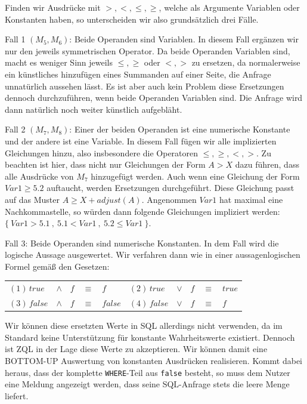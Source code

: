 Finden wir Ausdrücke mit $>,<,\leq,\geq$, welche als Argumente Variablen oder Konstanten haben, so unterscheiden wir also grundsätzlich drei Fälle.

Fall 1 $(M_5,M_6)$: Beide Operanden sind Variablen. In diesem Fall ergänzen wir nur den jeweils symmetrischen Operator. Da beide Operanden Variablen sind, macht es weniger Sinn jeweils $\leq,\geq$ oder $<,>$ zu ersetzen, da normalerweise ein künstliches hinzufügen eines Summanden auf einer Seite, die Anfrage unnatürlich aussehen lässt. Es ist aber auch kein Problem diese Ersetzungen dennoch durchzuführen, wenn beide Operanden Variablen sind. Die Anfrage wird dann natürlich noch weiter künstlich aufgebläht.

Fall 2 $(M_7,M_8)$: Einer der beiden Operanden ist eine numerische Konstante und der andere ist eine Variable. In diesem Fall fügen wir alle implizierten Gleichungen hinzu, also insbesondere die Operatoren $\leq,\geq,<,>$. Zu beachten ist hier, dass nicht nur Gleichungen der Form $A>X$ dazu führen, dass alle Ausdrücke von $M_7$ hinzugefügt werden. Auch wenn eine Gleichung der Form $Var1\geq 5.2$ auftaucht, werden Ersetzungen durchgeführt. Diese Gleichung passt auf das Muster $A\geq X+\mathit{adjust}(A)$. Angenommen $Var1$ hat maximal eine Nachkommastelle, so würden dann folgende Gleichungen impliziert werden: $\{\ Var1>5.1\ ,\ 5.1<Var1\ ,\ 5.2 \leq Var1\ \}$.

Fall 3: Beide Operanden sind numerische Konstanten. In dem Fall wird die logische Aussage ausgewertet. Wir verfahren dann wie in einer aussagenlogischen Formel gemäß den Gesetzen: 
\begin{center}
\begin{tabular}{lclcllclcl}
$(1)\,true $ & $\wedge$ & $ f$ & $\equiv$ & $ f$ & $(2)\,true $ & $\vee$ & $ f$ & $\equiv$ & $true$\\
$(3)\,false $ & $\wedge$ & $ f$ & $\equiv$ & $false$ & $(4)\,false $ & $\vee$ & $ f$ & $\equiv$ & $f$\\
\end{tabular}
\end{center}

Wir können diese ersetzten Werte in SQL allerdings nicht verwenden, da im Standard keine Unterstützung für konstante Wahrheitswerte existiert. Dennoch ist ZQL in der Lage diese Werte zu akzeptieren. Wir können damit eine BOTTOM-UP Auswertung von konstanten Ausdrücken realisieren. Kommt dabei heraus, dass der komplette \verb|WHERE|-Teil aus \verb|false| besteht, so muss dem Nutzer eine Meldung angezeigt werden, dass seine SQL-Anfrage stets die leere Menge liefert.

